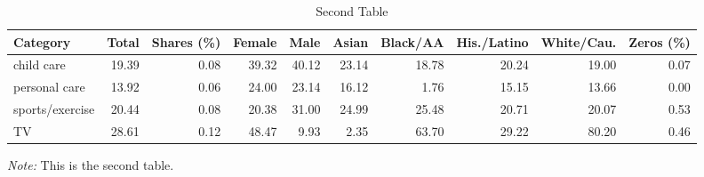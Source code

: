 \documentclass[letterpaper]{report}
\begin{document}
\begin{appendices}
\renewcommand*\arraystretch{0.95}
\renewcommand{\tabcolsep}{7.5pt}
\begin{table}[H]
  \addtocounter{table}{-1}
  \renewcommand{\thetable}{B.\arabic{table}b}
  \caption{Second Table}
  \label{summary_b}
  \fontsize{9}{11}\selectfont
  \hspace*{-0.5cm}
  \begin{tabular}{lrrrrrrrrr}
    \toprule
    Category                   & Total & Shares (\%) & Female & Male  & Asian & Black/AA & His./Latino & White/Cau. & Zeros (\%) \\ \hline
    child care                 & 19.39 & 0.08   & 39.32  & 40.12 & 23.14 & 18.78    & 20.24       & 19.00      & 0.07  \\
    personal care              & 13.92 & 0.06   & 24.00  & 23.14 & 16.12 & 1.76    & 15.15       & 13.66      & 0.00  \\
    sports/exercise            & 20.44 & 0.08   & 20.38  & 31.00 & 24.99 & 25.48    & 20.71       & 20.07      & 0.53  \\
    TV                         & 28.61 & 0.12   & 48.47  & 9.93 & 2.35 & 63.70    & 29.22       & 80.20      & 0.46  \\ \bottomrule
  \end{tabular}
  \hspace*{-1cm}
  \begin{minipage}{1.065\textwidth}
    \onehalfspacing
    \vspace*{0.05cm}
    \begin{tablenotes}
      \footnotesize
      \item\textit{Note:} This is the second table.
    \end{tablenotes}
  \end{minipage}
\end{table}

\begin{multicols}{2}
  \raggedcolumns
  
  

\end{multicols}
\end{appendices}
\end{document}
